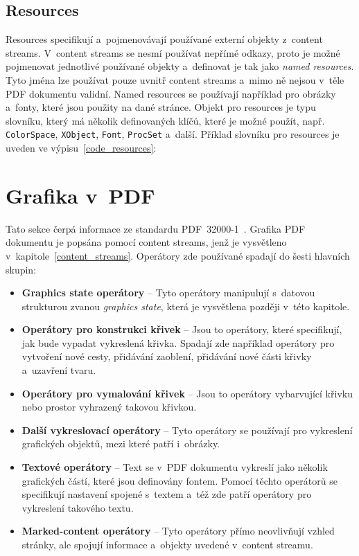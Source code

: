 \subsection*{Resources} \label{resources}
Resources specifikují a~pojmenovávají používané externí objekty z~content streams.
V~content streams se nesmí používat nepřímé odkazy, proto je možné pojmenovat
jednotlivé používané objekty a~definovat je tak jako \emph{named resources}.
Tyto jména lze používat pouze uvnitř content streams a~mimo ně nejsou v~těle PDF
dokumentu validní. Named resources se používají například pro obrázky a~fonty,
které jsou použity na dané stránce. Objekt pro resources je typu slovníku, který
má několik definovaných klíčů, které je možné použít, např. \texttt{ColorSpace}, 
\texttt{XObject}, \texttt{Font}, \texttt{ProcSet} a~další. Příklad slovníku pro
resources je uveden ve výpisu~\ref{code_resources}:



\section{Grafika v~PDF}
Tato sekce čerpá informace ze standardu PDF~32000-1~\cite[k.~8, s.~110--236]{PDF32000-1:2008}.
Grafika PDF dokumentu je popsána pomocí content streams, jenž je vysvětleno
v~kapitole~\ref{content_streams}. Operátory zde používané spadají do šesti
hlavních skupin:
\begin{itemize}
    \item \textbf{Graphics state operátory} -- Tyto operátory manipulují
    s~datovou strukturou zvanou \emph{graphics state}, která je vysvětlena později
    v~této kapitole.
    \item \textbf{Operátory pro konstrukci křivek} -- Jsou to operátory, které
    specifikují, jak bude vypadat vykreslená křivka. Spadají zde například
    operátory pro vytvoření nové cesty, přidávání zaoblení, přidávání nové části
    křivky a~uzavření tvaru.
    \item \textbf{Operátory pro vymalování křivek} -- Jsou to operátory vybarvující
    křivku nebo prostor vyhrazený takovou křivkou.
    \item \textbf{Další vykreslovací operátory} -- Tyto operátory se používají
    pro vykreslení grafických objektů, mezi které patří i~obrázky.
    \item \textbf{Textové operátory} -- Text se v~PDF dokumentu vykreslí jako několik
    grafických částí, které jsou definovány fontem. Pomocí těchto operátorů
    se specifikují nastavení spojené s~textem a~též zde patří operátory pro
    vykreslení takového textu. 
    \item \textbf{Marked-content operátory} -- Tyto operátory přímo neovlivňují
    vzhled stránky, ale spojují informace a~objekty uvedené v~content streamu.
\end{itemize}


